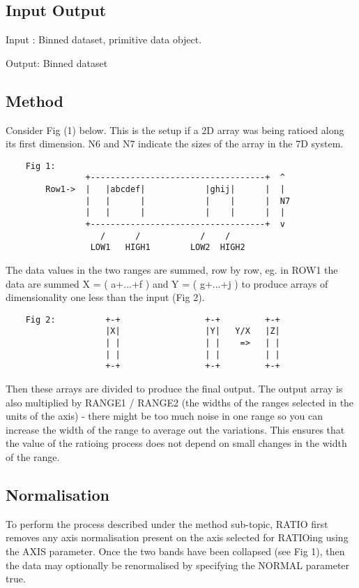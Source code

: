 \documentclass{book}
\renewcommand{\_}{{\tt\char'137}}     %
\begin{document}
\subsection{Input Output}
Input : Binned dataset, primitive data object.

Output: Binned dataset

\subsection{Method}
Consider Fig (1) below. This is the setup if a 2D array was being
ratioed along its first dimension. N6 and N7 indicate the sizes
of the array in the 7D system.

\begin{verbatim}
    Fig 1:
                +-----------------------------------+  ^
        Row1->  |   |abcdef|            |ghij|      |  |
                |   |      |            |    |      |  N7
                |   |      |            |    |      |  |
                +-----------------------------------+  v
                   /      /            /    /
                 LOW1   HIGH1        LOW2  HIGH2
 \end{verbatim}
The data values in the two ranges are summed, row by row, eg. in
ROW1 the data are summed X = ( a+...+f ) and Y = ( g+...+j ) to
produce arrays of dimensionality one less than the input (Fig 2).
\begin{verbatim}
    Fig 2:          +-+                 +-+         +-+
                    |X|                 |Y|   Y/X   |Z|
                    | |                 | |    =>   | |
                    | |                 | |         | |
                    +-+                 +-+         +-+
  \end{verbatim}
Then these arrays are divided to produce the final output. The
output array is also multiplied by RANGE1 / RANGE2 (the widths of
the ranges selected in the units of the axis) - there might be
too much noise in one range so you can increase the width of the
range to average out the variations. This ensures that the value
of the ratioing process does not depend on small changes in the
width of the range.

\subsection{Normalisation}
To perform the process described under the method sub-topic, RATIO
first removes any axis normalisation present on the axis selected
for RATIOing using the AXIS parameter. Once the two bands have been
collapsed (see Fig 1), then the data may optionally be renormalised
by specifying the NORMAL parameter true.
\end{document}
